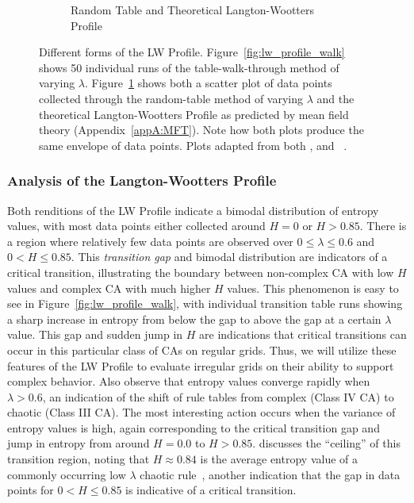 \documentclass[a4paper,11pt]{article}
\begin{document}
\begin{figure}[htp]
\begin{subfigure}[t]{0.65\textwidth}
  \caption{Random Table and Theoretical Langton-Wootters Profile}
  \label{fig:lw_profile_rand}
  \end{subfigure}
\caption[The Langton-Wootters Profile]{
  Different forms of the LW Profile. Figure~\ref{fig:lw_profile_walk} shows 50 individual runs of the table-walk-through method of varying $\lambda$. Figure~\ref{fig:lw_profile_rand} shows both a scatter plot of data points collected through the random-table method of varying $\lambda$ and the theoretical Langton-Wootters Profile as predicted by mean field theory (Appendix~\ref{appA:MFT}). Note how both plots produce the same envelope of data points. Plots adapted from both \citeauthor{wo90}, and \citeauthor{la90}~\cite{la90,wo90}.
}
\label{fig:lw_profile}
\end{figure}

\subsubsection*{Analysis of the Langton-Wootters Profile}

Both renditions of the LW Profile indicate a bimodal distribution of entropy values, with most data points either collected around $H=0$ or $H > 0.85$. There is a region where relatively few data points are observed over $0 \le \lambda \le 0.6$ and $0 < H \le 0.85$. This \textit{transition gap} and bimodal distribution are indicators of a critical transition, illustrating the boundary between non-complex CA with low $H$ values and complex CA with much higher $H$ values. This phenomenon is easy to see in Figure~\ref{fig:lw_profile_walk}, with individual transition table runs showing a sharp increase in entropy from below the gap to above the gap at a certain $\lambda$ value. This gap and sudden jump in $H$ are indications that critical transitions can occur in this particular class of CAs on regular grids. Thus, we will utilize these features of the LW Profile to evaluate irregular grids on their ability to support complex behavior. 
Also observe that entropy values converge rapidly when $\lambda > 0.6$, an indication of the shift of rule tables from complex (Class IV CA) to chaotic (Class III CA). The most interesting action occurs when the variance of entropy values is high, again corresponding to the critical transition gap and jump in entropy from around $H=0.0$ to $H > 0.85$. \citeauthor{la90} discusses the ``ceiling'' of this transition region, noting that $H \approx 0.84$ is the average entropy value of a commonly occurring low $\lambda$ chaotic rule~\cite{la90}, another indication that the gap in data points for $0 < H \le 0.85$ is indicative of a critical transition.
\end{document}
